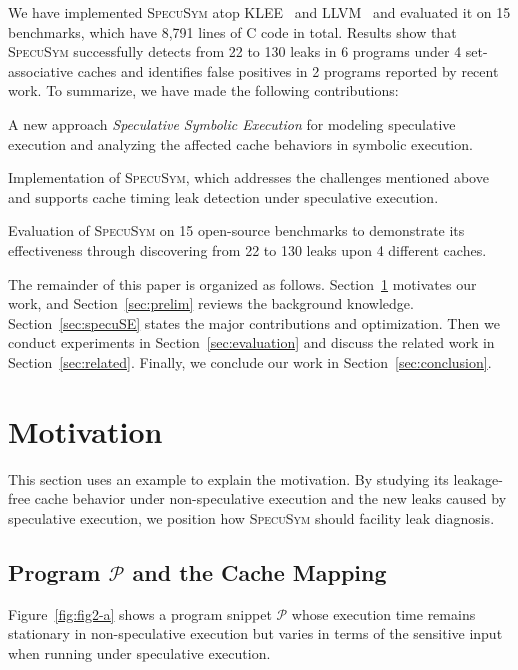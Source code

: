 \documentclass[sigconf]{acmart}
\newcommand{\SpecuSym}{\textsc{SpecuSym} }
\newcommand{\prog}{\mathcal{P}}
\begin{document}
We have implemented \SpecuSym atop KLEE~\cite{CadarDE08} and LLVM~\cite{LattnerA04} 
and evaluated it on 15 benchmarks, which have 8,791 lines of C code in total. Results 
show that \SpecuSym successfully detects from 22 to 130 leaks in 6 programs under 4 
set-associative caches and identifies false positives in 2 programs reported by recent 
work. To summarize, we have made the following contributions:

\begin{compactitem}
  \item 
    A new approach \emph{Speculative Symbolic Execution} for modeling speculative 
		execution and analyzing the affected cache behaviors in symbolic execution.
  \item 
		Implementation of \textsc{SpecuSym}, which addresses the challenges mentioned
		above and supports cache timing leak detection under speculative execution. 
  \item 
    Evaluation of \SpecuSym on 15 open-source benchmarks to demonstrate its 
    effectiveness through discovering from 22 to 130 leaks upon 4 different 
		caches.
\end{compactitem}




The remainder of this paper is organized as follows. Section~\ref{sec:mtv} 
motivates our work, and Section~\ref{sec:prelim} reviews the background 
knowledge. Section~\ref{sec:specuSE} states the major contributions and
optimization. Then we conduct experiments in Section~\ref{sec:evaluation} 
and discuss the related work in Section~\ref{sec:related}. Finally, we 
conclude our work in Section~\ref{sec:conclusion}.




\section{Motivation}
\label{sec:mtv}

This section uses an example to explain the motivation. By studying its 
leakage-free cache behavior under non-speculative execution and the new 
leaks caused by speculative execution, we position how \SpecuSym should
facility leak diagnosis.


\subsection{Program ${\prog}$ and the Cache Mapping}
\label{sec:leak_example}

Figure~\ref{fig:fig2-a} shows a program snippet ${\prog}$ whose execution 
time remains stationary in non-speculative execution but varies in terms
of the sensitive input when running under speculative execution.
\end{document}
